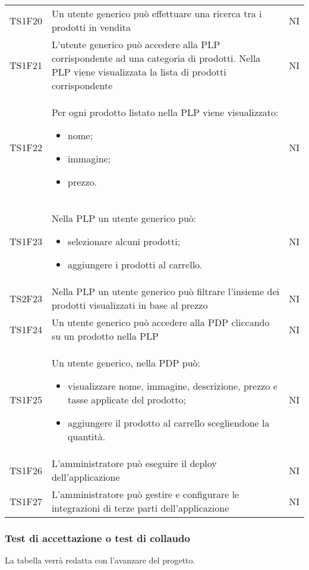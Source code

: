 {\begin{longtable}{C{3cm} C{10.2cm} C{1.5cm}}
TS1F20 & Un utente generico può effettuare una ricerca tra i prodotti in vendita & NI\\

TS1F21 & L'utente generico può accedere alla PLP corrispondente ad una categoria di prodotti. Nella PLP viene visualizzata la lista di prodotti corrispondente & NI\\

TS1F22 & Per ogni prodotto listato nella PLP viene visualizzato:
\begin{itemize}
	\item nome;
	\item immagine;
	\item prezzo.
\end{itemize} & NI\\

TS1F23 & Nella PLP un utente generico può:
\begin{itemize}
	\item selezionare alcuni prodotti;
	\item aggiungere i prodotti al carrello.
\end{itemize} & NI\\

TS2F23 & Nella PLP un utente generico può filtrare l'insieme dei prodotti visualizzati in base al prezzo & NI\\

TS1F24 & Un utente generico può accedere alla PDP cliccando su un prodotto nella PLP & NI\\

TS1F25 & Un utente generico, nella PDP può:
\begin{itemize}
	\item visualizzare nome, immagine, descrizione, prezzo e tasse applicate del prodotto;
	\item aggiungere il prodotto al carrello scegliendone la quantità.
\end{itemize} & NI\\

TS1F26 & L'amministratore può eseguire il deploy dell'applicazione & NI\\

TS1F27 & L'amministratore può gestire e configurare le integrazioni di terze parti dell'applicazione & NI\\



\end{longtable}


}
\subsubsection{Test di accettazione o test di collaudo}
La tabella verrà redatta con l'avanzare del progetto.